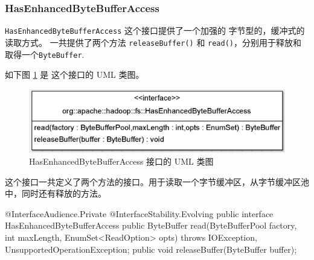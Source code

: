 \subsubsection{HasEnhancedByteBufferAccess}
\label{sec:uml:input:hasenhancedbytebufferaccess}

\lstinline|HasEnhancedByteBufferAccess| 这个接口提供了一个加强的 字节型的，缓冲式的读取方式。
一共提供了两个方法 \lstinline|releaseBuffer()| 和 \lstinline|read()|，分别用于释放和取得一个\lstinline|ByteBuffer|.

如下图 \ref{fig:HasEnhancedByteBufferAccess} 是 这个接口的 UML 类图。
\begin{figure}[h]
\centering
\includegraphics[width=1\linewidth]{HasEnhancedByteBufferAccess}
\caption{HasEnhancedByteBufferAccess 接口的 UML 类图}
\label{fig:HasEnhancedByteBufferAccess}
\end{figure}

这个接口一共定义了两个方法的接口。用于读取一个字节缓冲区，从字节缓冲区池中，同时还有释放的方法。
\begin{java}
@InterfaceAudience.Private
@InterfaceStability.Evolving
public interface HasEnhancedByteBufferAccess {
    public ByteBuffer read(ByteBufferPool factory, int maxLength, EnumSet<ReadOption> opts) throws IOException, UnsupportedOperationException;
    public void releaseBuffer(ByteBuffer buffer);
}    
\end{java}